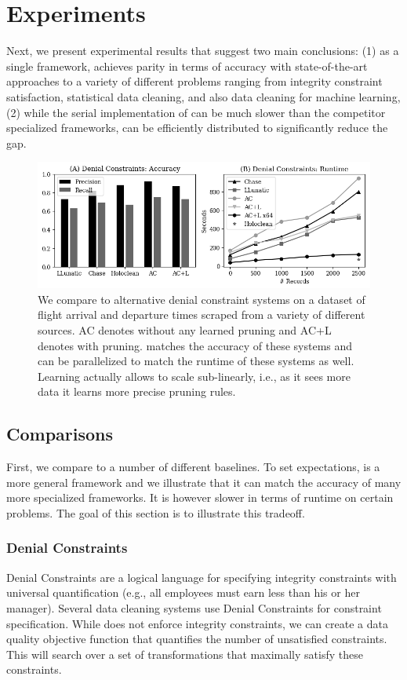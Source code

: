 \section{Experiments}\label{s:exp}
Next, we present experimental results that suggest two main conclusions: (1) as a single framework, \sys achieves parity in terms of accuracy with state-of-the-art approaches to a variety of different problems ranging from integrity constraint satisfaction, statistical data cleaning, and also data cleaning for machine learning, (2) while the serial implementation of \sys can be much slower than the competitor specialized frameworks, \sys can be efficiently distributed to significantly reduce the gap.

\begin{figure}
    \centering
    \includegraphics[width=\columnwidth]{exp/exp1.png}
    \caption{We compare \sys to alternative denial constraint systems on a dataset of flight arrival and departure times scraped from a variety of different sources. AC denotes \sys without any learned pruning and AC+L denotes \sys with pruning.
    \sys matches the accuracy of these systems and can be parallelized to match the runtime of these systems as well. Learning actually allows \sys to scale sub-linearly, i.e., as it sees more data it learns more precise pruning rules.\label{exp1a}}
\end{figure}

\subsection{Comparisons}
First, we compare \sys to a number of different baselines. To set expectations, \sys is a more general framework and we illustrate that it can match the accuracy of many more specialized frameworks. It is however slower in terms of runtime on certain problems. The goal of this section is to illustrate this tradeoff.

\subsubsection{Denial Constraints}
Denial Constraints are a logical language for specifying integrity constraints with universal quantification (e.g., all employees must earn less than his or her manager).
Several data cleaning systems use Denial Constraints for constraint specification. 
While \sys does not enforce integrity constraints, we can create a data quality objective function that quantifies the number of unsatisfied constraints.
This will search over a set of transformations that maximally satisfy these constraints.

